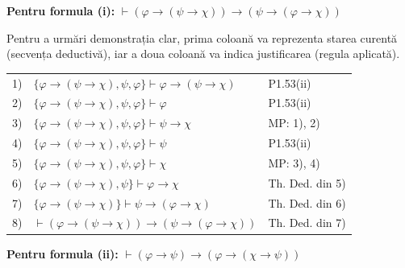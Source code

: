 \begin{solutie}
\vspace{0.3cm}
\noindent \textbf{Pentru formula (i):} $\vdash (\varphi \rightarrow (\psi \rightarrow \chi)) \rightarrow (\psi \rightarrow (\varphi \rightarrow \chi))$

Pentru a urmări demonstrația clar, prima coloană va reprezenta starea curentă (secvența deductivă), iar a doua coloană va indica justificarea (regula aplicată).

\begin{center}
\renewcommand{\arraystretch}{1.3} %
\begin{tabular}{r l l}
1) & $\{\varphi \rightarrow (\psi \rightarrow \chi), \psi, \varphi\} \vdash \varphi \rightarrow (\psi \rightarrow \chi)$ & P1.53(ii) \\
2) & $\{\varphi \rightarrow (\psi \rightarrow \chi), \psi, \varphi\} \vdash \varphi$ & P1.53(ii) \\
3) & $\{\varphi \rightarrow (\psi \rightarrow \chi), \psi, \varphi\} \vdash \psi \rightarrow \chi$ & MP: 1), 2) \\
4) & $\{\varphi \rightarrow (\psi \rightarrow \chi), \psi, \varphi\} \vdash \psi$ & P1.53(ii) \\
5) & $\{\varphi \rightarrow (\psi \rightarrow \chi), \psi, \varphi\} \vdash \chi$ & MP: 3), 4) \\
6) & $\{\varphi \rightarrow (\psi \rightarrow \chi), \psi\} \vdash \varphi \rightarrow \chi$ & Th. Ded. din 5) \\
7) & $\{\varphi \rightarrow (\psi \rightarrow \chi)\} \vdash \psi \rightarrow (\varphi \rightarrow \chi)$ & Th. Ded. din 6) \\
8) & $\vdash (\varphi \rightarrow (\psi \rightarrow \chi)) \rightarrow (\psi \rightarrow (\varphi \rightarrow \chi))$ & Th. Ded. din 7) \\
\end{tabular}
\end{center}

\vspace{0.5cm}
\noindent \textbf{Pentru formula (ii):} $\vdash (\varphi \rightarrow \psi) \rightarrow (\varphi \rightarrow (\chi \rightarrow \psi))$


\end{solutie}
